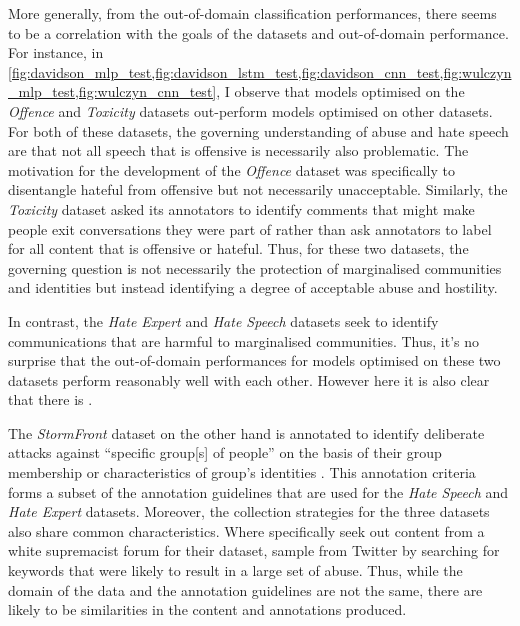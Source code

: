 More generally, from the out-of-domain classification performances, there seems to be a correlation with the goals of the datasets and out-of-domain performance.
For instance, in \cref{fig:davidson_mlp_test,fig:davidson_lstm_test,fig:davidson_cnn_test,fig:wulczyn_mlp_test,fig:wulczyn_cnn_test}, I observe that models optimised on the \textit{Offence} and \textit{Toxicity} datasets out-perform models optimised on other datasets.
For both of these datasets, the governing understanding of abuse and hate speech are that not all speech that is offensive is necessarily also problematic.
The motivation for the development of the \textit{Offence} dataset was specifically to disentangle hateful from offensive but not necessarily unacceptable.
Similarly, the \textit{Toxicity} dataset asked its annotators to identify comments that might make people exit conversations they were part of rather than ask annotators to label for all content that is offensive or hateful.
Thus, for these two datasets, the governing question is not necessarily the protection of marginalised communities and identities but instead identifying a degree of acceptable abuse and hostility.

In contrast, the \textit{Hate Expert} and \textit{Hate Speech} datasets seek to identify communications that are harmful to marginalised communities.
Thus, it's no surprise that the out-of-domain performances for models optimised on these two datasets perform reasonably well with each other.
However here it is also clear that there is .

The \textit{StormFront} dataset on the other hand is annotated to identify deliberate attacks against ``specific group[s] of people'' on the basis of their group membership or characteristics of group's identities \citep{Garcia:2019}.
This annotation criteria forms a subset of the annotation guidelines that are used for the \textit{Hate Speech} and \textit{Hate Expert} datasets.
Moreover, the collection strategies for the three datasets also share common characteristics.
Where \citet{Garcia:2019} specifically seek out content from a white supremacist forum for their dataset, \citet{Waseem:2016,Waseem-Hovy:2016} sample from Twitter by searching for keywords that were likely to result in a large set of  abuse.
Thus, while the domain of the data and the annotation guidelines are not the same, there are likely to be similarities in the content and annotations produced.


